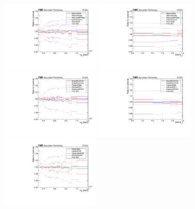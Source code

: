 \begin{figure}
  \centering
  \includegraphics[width=0.45\textwidth]{fig/chapt7/syst/JEC/MassTT_1.pdf}
  \includegraphics[width=0.45\textwidth]{fig/chapt7/syst/JEC/CosTopLepTT_1.pdf} \\
  \includegraphics[width=0.45\textwidth]{fig/chapt7/syst/JEC/MassTT_2.pdf}
  \includegraphics[width=0.45\textwidth]{fig/chapt7/syst/JEC/CosTopLepTT_2.pdf} \\
  \includegraphics[width=0.45\textwidth]{fig/chapt7/syst/JEC/MassTT_3.pdf}

\end{figure}
